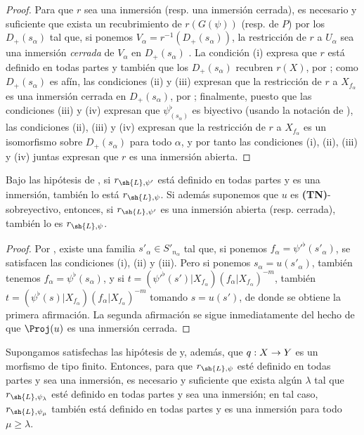 \documentclass[oneside,10pt]{amsart}
\makeatletter
\renewcommand{\geq}{\geqslant}
\newcommand{\ega@arrow}[2]{\mathchoice{#1}{#2}{#2}{#2}}
\renewcommand{\to}{\ega@arrow{\longrightarrow}{\rightarrow}}
\let\EGAOriginalLabel\label
\renewcommand{\label}[1]{\phantomsection\EGAOriginalLabel{#1}}
\makeatother
\begin{document}
\begin{proof}
Para que $r$ sea una inmersión (resp. una inmersión cerrada), es necesario y suficiente que exista un recubrimiento de $r(G(\psi))$ (resp. de $P$) por los $D_+(s_\alpha)$ tal que, si ponemos $V_\alpha=r^{-1}(D_+(s_\alpha))$, la restricción de $r$ a $U_\alpha$ sea una inmersión \emph{cerrada} de $V_\alpha$ en $D_+(s_\alpha)$ .
La condición (i) expresa que $r$ está definido en todas partes y también que los $D_+(s_\alpha)$ recubren $r(X)$, por ;
como $D_+(s_\alpha)$ es afín, las condiciones (ii) y (iii) expresan que la restricción de $r$ a $X_{f_\alpha}$ es una inmersión cerrada en $D_+(s_\alpha)$, por ;
finalmente, puesto que las condiciones (iii) y (iv) expresan que $\psi_{(s_\alpha)}^\flat$ es biyectivo (usando la notación de ), las condiciones (ii), (iii) y (iv) expresan que la restricción de $r$ a $X_{f_\alpha}$ es un isomorfismo sobre $D_+(s_\alpha)$ para todo $\alpha$, y por tanto las condiciones (i), (ii), (iii) y (iv) juntas expresan que $r$ es una inmersión abierta.
\end{proof}

\begin{corollary}[3.8.3]
\label{II.3.8.3}
Bajo las hipótesis de , si $r_{\sh{L},\psi'}$ está definido en todas partes y es una inmersión, también lo está $r_{\sh{L},\psi}$.
Si además suponemos que $u$ es \textup{\textbf{(TN)}}-sobreyectivo, entonces, si $r_{\sh{L},\psi'}$ es una inmersión abierta \textup{(resp.} cerrada\textup{)}, también lo es $r_{\sh{L},\psi}$.
\end{corollary}

\begin{proof}
Por , existe una familia $s'_\alpha\in S'_{n_\alpha}$ tal que, si ponemos $f_\alpha=\psi'^\flat(s'_\alpha)$, se satisfacen las condiciones (i), (ii) y (iii).
Pero si ponemos $s_\alpha=u(s'_\alpha)$, también tenemos $f_\alpha=\psi^\flat(s_\alpha)$, y si $t=(\psi'^\flat(s')|X_{f_\alpha})(f_\alpha|X_{f_\alpha})^{-m}$, también $t=(\psi^\flat(s)|X_{f_\alpha})(f_\alpha|X_{f_\alpha})^{-m}$ tomando $s=u(s')$, de donde se obtiene la primera afirmación.
La segunda afirmación se sigue inmediatamente del hecho de que $\Proj(u)$ es una inmersión cerrada.
\end{proof}

\begin{proposition}[3.8.4]
\label{II.3.8.4}
Supongamos satisfechas las hipótesis de  y, además, que $q:X\to Y$ es un morfismo de tipo finito.
Entonces, para que $r_{\sh{L},\psi}$ esté definido en todas partes y sea una inmersión, es necesario y suficiente que exista algún $\lambda$ tal que $r_{\sh{L},\psi_\lambda}$ esté definido en todas partes y sea una inmersión;
en tal caso, $r_{\sh{L},\psi_\mu}$ también está definido en todas partes y es una inmersión para todo $\mu\geq\lambda$.
\end{proposition}
\end{document}
